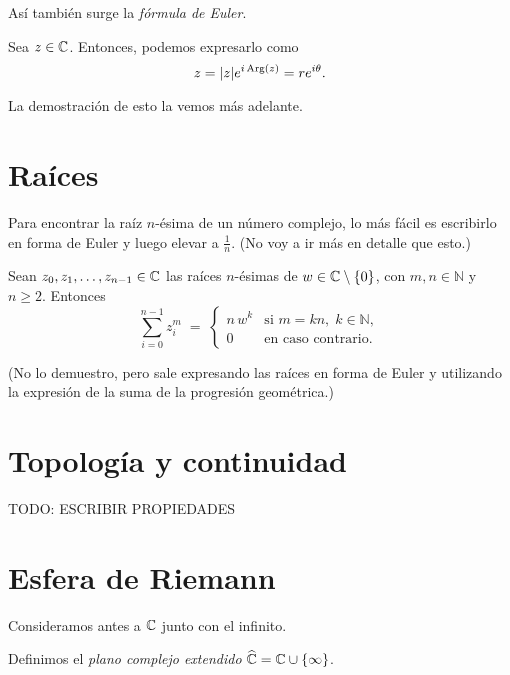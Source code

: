 Así también surge la \textit{fórmula de Euler}.

\begin{theorem}
    Sea $z \in \mathbb{C}$. Entonces, podemos expresarlo como
    \begin{equation*}
        z = |z| e^{i \operatorname{Arg}(z)} = r e^{i \theta}.
    \end{equation*}
\end{theorem}

La demostración de esto la vemos más adelante.


\section{Raíces}

Para encontrar la raíz $n$-ésima de un número complejo, lo más fácil es escribirlo en forma de Euler y luego elevar a $\frac{1}{n}$. (No voy a ir más en detalle que esto.)

\begin{proposition}
    Sean $z_0, z_1, \dots, z_{n-1} \in \mathbb{C}$ las raíces $n$-ésimas de $w \in \mathbb{C} \setminus \{0\}$, con $m,n \in \mathbb{N}$ y $n \geq 2$. Entonces
    \begin{equation}
        \sum_{i=0}^{n-1} z_i^m \;=\;
        \begin{cases}
            n\,w^k & \text{si } m = k n,\; k \in \mathbb{N},\\
            0 & \text{en caso contrario}.
        \end{cases}
    \end{equation}
\end{proposition}

(No lo demuestro, pero sale expresando las raíces en forma de Euler y utilizando la expresión de la suma de la progresión geométrica.)


\section{Topología y continuidad}

{\color{red} TODO: ESCRIBIR PROPIEDADES}


\section{Esfera de Riemann}

Consideramos antes a $\mathbb{C}$ junto con el infinito.

\begin{definition}
    Definimos el \emph{plano complejo extendido} $\widehat{\mathbb{C}} = \mathbb{C} \cup \{\infty\}$.
\end{definition}

